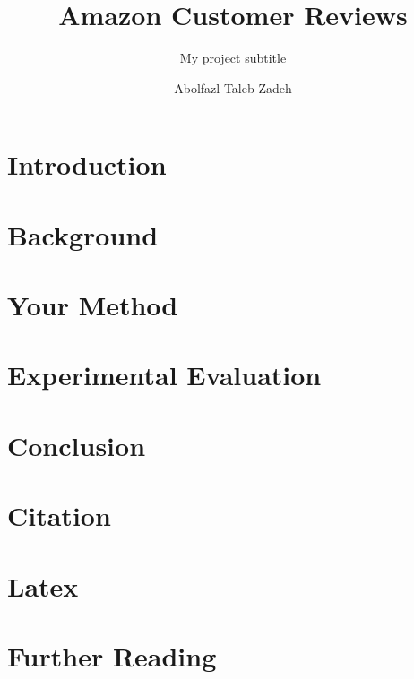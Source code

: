 \documentclass[sigconf]{acmart}
\begin{document}
\title{Amazon Customer Reviews}
\subtitle{My project subtitle}

\author{Abolfazl Taleb Zadeh}




\begin{abstract}

\end{abstract}


\maketitle


\section{Introduction}
\label{sec:introduction}


\section{Background}
\label{sec:background}


\section{Your Method}
\label{sec:method}


\section{Experimental Evaluation}
\label{sec:evaluation}


\section{Conclusion}
\label {sec:conclusion}


\section{Citation}
\label{sec:citation}



\section{Latex}
\label{sec:latex} 


\section{Further Reading}
\label{sec:further}




\end{document}
